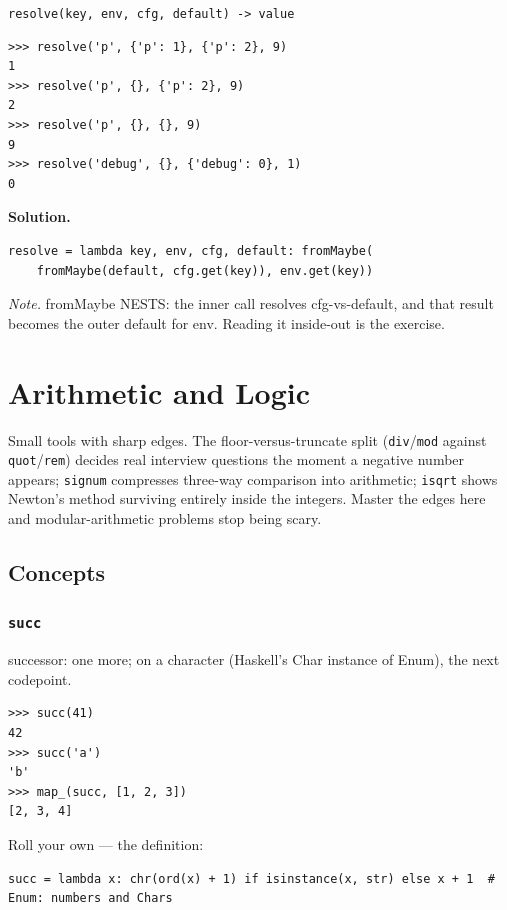 \documentclass[10pt,letterpaper]{book}
\begin{document}
\noindent\texttt{resolve(key, env, cfg, default) -> value}
\begin{lstlisting}[style=ex]
>>> resolve('p', {'p': 1}, {'p': 2}, 9)
1
>>> resolve('p', {}, {'p': 2}, 9)
2
>>> resolve('p', {}, {}, 9)
9
>>> resolve('debug', {}, {'debug': 0}, 1)
0
\end{lstlisting}
\noindent\textbf{Solution.}
\begin{lstlisting}[style=code]
resolve = lambda key, env, cfg, default: fromMaybe(
    fromMaybe(default, cfg.get(key)), env.get(key))
\end{lstlisting}
\noindent\textit{Note.} fromMaybe NESTS: the inner call resolves cfg-vs-default, and that result becomes the outer default for env. Reading it inside-out is the exercise.

\clearpage
\chapter{Arithmetic and Logic}

Small tools with sharp edges. The floor-versus-truncate split
(\texttt{div}/\texttt{mod} against \texttt{quot}/\texttt{rem}) decides real
interview questions the moment a negative number appears; \texttt{signum}
compresses three-way comparison into arithmetic; \texttt{isqrt} shows Newton's
method surviving entirely inside the integers. Master the edges here and
modular-arithmetic problems stop being scary.
\section{Concepts}
\subsection{\texttt{succ}}\label{def:succ}
successor: one more; on a character (Haskell's Char instance of Enum), the next codepoint.
\begin{lstlisting}[style=ex]
>>> succ(41)
42
>>> succ('a')
'b'
>>> map_(succ, [1, 2, 3])
[2, 3, 4]
\end{lstlisting}

Roll your own --- the definition:

\begin{lstlisting}[style=ex]
succ = lambda x: chr(ord(x) + 1) if isinstance(x, str) else x + 1  # Enum: numbers and Chars
\end{lstlisting}
\end{document}
